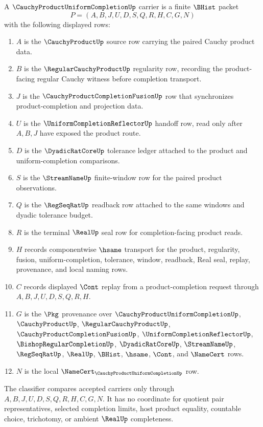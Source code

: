\begin{definition}
\label{def:cauchy-product-uniform-completion-carrier}
A $\CauchyProductUniformCompletionUp$ carrier is a finite $\BHist$ packet
$$
P=(A,B,J,U,D,S,Q,R,H,C,G,N)
$$
with the following displayed rows:
\begin{enumerate}
\item $A$ is the $\CauchyProductUp$ source row carrying the paired Cauchy product data.
\item $B$ is the $\RegularCauchyProductUp$ regularity row, recording the product-facing regular Cauchy witness before completion transport.
\item $J$ is the $\CauchyProductCompletionFusionUp$ row that synchronizes product-completion and projection data.
\item $U$ is the $\UniformCompletionReflectorUp$ handoff row, read only after $A,B,J$ have exposed the product route.
\item $D$ is the $\DyadicRatCoreUp$ tolerance ledger attached to the product and uniform-completion comparisons.
\item $S$ is the $\StreamNameUp$ finite-window row for the paired product observations.
\item $Q$ is the $\RegSeqRatUp$ readback row attached to the same windows and dyadic tolerance budget.
\item $R$ is the terminal $\RealUp$ seal row for completion-facing product reads.
\item $H$ records componentwise $\hsame$ transport for the product, regularity, fusion, uniform-completion, tolerance, window, readback, Real seal, replay, provenance, and local naming rows.
\item $C$ records displayed $\Cont$ replay from a product-completion request through $A,B,J,U,D,S,Q,R,H$.
\item $G$ is the $\Pkg$ provenance over $\CauchyProductUniformCompletionUp$, $\CauchyProductUp$, $\RegularCauchyProductUp$, $\CauchyProductCompletionFusionUp$, $\UniformCompletionReflectorUp$, $\BishopRegularCompletionUp$, $\DyadicRatCoreUp$, $\StreamNameUp$, $\RegSeqRatUp$, $\RealUp$, $\BHist$, $\hsame$, $\Cont$, and $\NameCert$ rows.
\item $N$ is the local $\NameCert_{\CauchyProductUniformCompletionUp}$ row.
\end{enumerate}
The classifier compares accepted carriers only through $A,B,J,U,D,S,Q,R,H,C,G,N$. It has no coordinate for quotient pair representatives, selected completion limits, host product equality, countable choice, trichotomy, or ambient $\RealUp$ completeness.
\end{definition}

